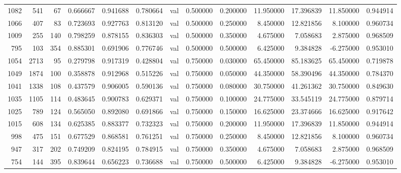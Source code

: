\begin{tabular}{rrrrrrlrrrrrr}
1082 & 541 & 67 & 0.666667 & 0.941688 & 0.780664 & val & 0.500000 & 0.200000 & 11.950000 & 17.396839 & 11.850000 & 0.944914 \\
1066 & 407 & 83 & 0.723693 & 0.927763 & 0.813120 & val & 0.500000 & 0.250000 & 8.450000 & 12.821856 & 8.100000 & 0.960734 \\
1009 & 255 & 140 & 0.798259 & 0.878155 & 0.836303 & val & 0.500000 & 0.350000 & 4.675000 & 7.058683 & 2.875000 & 0.968509 \\
795 & 103 & 354 & 0.885301 & 0.691906 & 0.776746 & val & 0.500000 & 0.500000 & 6.425000 & 9.384828 & -6.275000 & 0.953010 \\
1054 & 2713 & 95 & 0.279798 & 0.917319 & 0.428804 & val & 0.750000 & 0.030000 & 65.450000 & 85.183625 & 65.450000 & 0.719878 \\
1049 & 1874 & 100 & 0.358878 & 0.912968 & 0.515226 & val & 0.750000 & 0.050000 & 44.350000 & 58.390496 & 44.350000 & 0.784370 \\
1041 & 1338 & 108 & 0.437579 & 0.906005 & 0.590136 & val & 0.750000 & 0.080000 & 30.750000 & 41.261362 & 30.750000 & 0.849630 \\
1035 & 1105 & 114 & 0.483645 & 0.900783 & 0.629371 & val & 0.750000 & 0.100000 & 24.775000 & 33.545119 & 24.775000 & 0.879714 \\
1025 & 789 & 124 & 0.565050 & 0.892080 & 0.691866 & val & 0.750000 & 0.150000 & 16.625000 & 23.374666 & 16.625000 & 0.917642 \\
1015 & 608 & 134 & 0.625385 & 0.883377 & 0.732323 & val & 0.750000 & 0.200000 & 11.950000 & 17.396839 & 11.850000 & 0.944914 \\
998 & 475 & 151 & 0.677529 & 0.868581 & 0.761251 & val & 0.750000 & 0.250000 & 8.450000 & 12.821856 & 8.100000 & 0.960734 \\
947 & 317 & 202 & 0.749209 & 0.824195 & 0.784915 & val & 0.750000 & 0.350000 & 4.675000 & 7.058683 & 2.875000 & 0.968509 \\
754 & 144 & 395 & 0.839644 & 0.656223 & 0.736688 & val & 0.750000 & 0.500000 & 6.425000 & 9.384828 & -6.275000 & 0.953010 \\
\bottomrule
\end{tabular}
